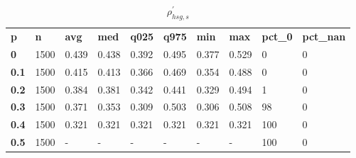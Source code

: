 \begin{table}[h]
 \centering 
\footnotesize
\caption{$\rho_{hsg,s}^\prime $}
\label{tab:alphahsgs}
\begin{tabular}[h]{| l l l l l l l l l l|
    } \hline
\textbf{ p} & \textbf{ n} & \textbf{ avg} & \textbf{ med} & \textbf{ q025} & \textbf{ q975} & \textbf{ min} & \textbf{ max} & \textbf{ pct\_0} & \textbf{ pct\_nan}
           \\
  \textbf{  0} & 1500 & 0.439 & 0.438 & 0.392 & 0.495 & 0.377 & 0.529 &   0 & 0
           \\
  \textbf{0.1} & 1500 & 0.415 & 0.413 & 0.366 & 0.469 & 0.354 & 0.488 &   0 & 0
           \\
  \textbf{0.2} & 1500 & 0.384 & 0.381 & 0.342 & 0.441 & 0.329 & 0.494 &   1 & 0
           \\
  \textbf{0.3} & 1500 & 0.371 & 0.353 & 0.309 & 0.503 & 0.306 & 0.508 &  98 & 0
           \\
  \textbf{0.4} & 1500 & 0.321 & 0.321 & 0.321 & 0.321 & 0.321 & 0.321 & 100 & 0
           \\
  \textbf{0.5} & 1500 & - & - & - & - & - & - & 100 & 0
           \\
 \hline \end{tabular}
 \end{table}
